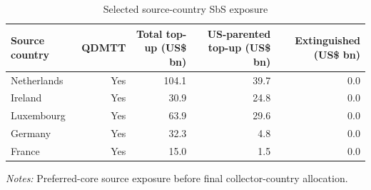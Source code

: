 \begin{table}[H]
\centering
\footnotesize
\setlength{\tabcolsep}{3pt}
\caption{Selected source-country SbS exposure}
\label{tab:app_stage45_sbs_source_exposure}
\begin{tabular}{@{}lrrrr@{}}
\toprule
Source country & QDMTT & Total top-up (US\$ bn) & US-parented top-up (US\$ bn) & Extinguished (US\$ bn) \\
\midrule
Netherlands & Yes & 104.1 & 39.7 & 0.0 \\
Ireland & Yes &  30.9 & 24.8 & 0.0 \\
Luxembourg & Yes &  63.9 & 29.6 & 0.0 \\
Germany & Yes &  32.3 &  4.8 & 0.0 \\
France & Yes &  15.0 &  1.5 & 0.0 \\
\bottomrule
\end{tabular}

\vspace{0.35em}
\noindent\begin{minipage}{\textwidth}
\footnotesize\raggedright\textit{Notes:} Preferred-core source exposure before final collector-country allocation.
\end{minipage}
\end{table}
